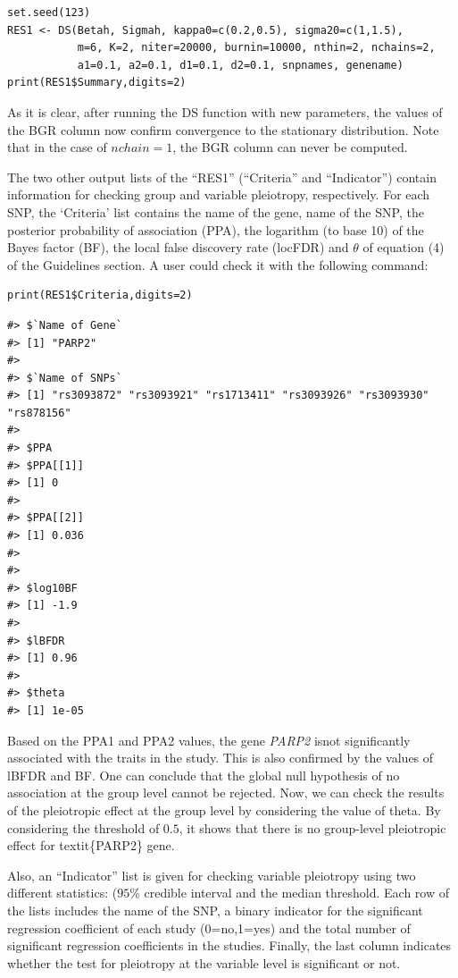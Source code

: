 \begin{verbatim}
set.seed(123)
RES1 <- DS(Betah, Sigmah, kappa0=c(0.2,0.5), sigma20=c(1,1.5),
           m=6, K=2, niter=20000, burnin=10000, nthin=2, nchains=2,
           a1=0.1, a2=0.1, d1=0.1, d2=0.1, snpnames, genename)
print(RES1$Summary,digits=2)
\end{verbatim}

As it is clear, after running the DS function with new parameters, the values of the BGR column now confirm convergence to the stationary distribution.
Note that in the case of \(nchain=1\), the BGR column can never be computed.

The two other output lists of the ``RES1'' (``Criteria'' and ``Indicator'') contain information for checking group and variable pleiotropy, respectively.
For each SNP, the `Criteria' list contains the name of the gene, name of the SNP, the posterior probability of association (PPA), the logarithm (to base 10) of
the Bayes factor (BF), the local false discovery rate (locFDR) and \(\theta\) of equation (4) of the Guidelines section. A user could check it with the following command:

\begin{verbatim}
print(RES1$Criteria,digits=2)
\end{verbatim}

\begin{verbatim}
#> $`Name of Gene`
#> [1] "PARP2"
#> 
#> $`Name of SNPs`
#> [1] "rs3093872" "rs3093921" "rs1713411" "rs3093926" "rs3093930" "rs878156" 
#> 
#> $PPA
#> $PPA[[1]]
#> [1] 0
#> 
#> $PPA[[2]]
#> [1] 0.036
#> 
#> 
#> $log10BF
#> [1] -1.9
#> 
#> $lBFDR
#> [1] 0.96
#> 
#> $theta
#> [1] 1e-05
\end{verbatim}

Based on the PPA1 and PPA2 values, the gene \emph{PARP2} isnot significantly associated with the traits in the study.
This is also confirmed by the values of lBFDR and BF. One can conclude that the global null hypothesis of no association at the group level cannot be rejected. Now, we can check the results of the pleiotropic effect at the group level by considering the value of theta. By considering the threshold of \(0.5\), it shows that there is no group-level pleiotropic effect for textit\{PARP2\} gene.

Also, an ``Indicator'' list is given for checking variable pleiotropy using two different statistics: (\(95\%\) credible interval and the median threshold. Each row of the lists includes the name of the SNP, a binary indicator for the significant regression coefficient of each study (0=no,1=yes) and the total number of significant regression coefficients in the studies. Finally, the last column indicates whether the test for pleiotropy at the variable level is significant or not.

